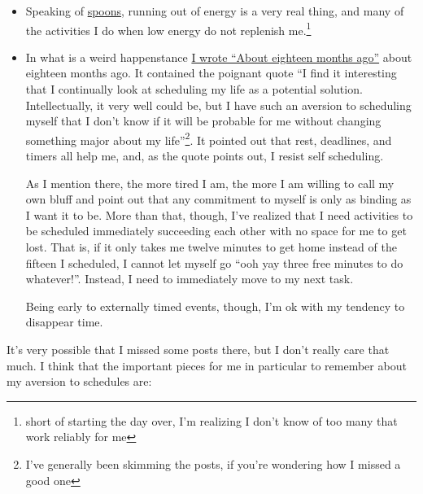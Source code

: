 \documentclass[12pt]{article}[titlepage]
\newcommand{\say}[1]{``#1''}
\renewcommand{\,}{\textsuperscript{,}}
\begin{document}
\begin{itemize}
\item Speaking of \href{spoons-and-spell-slots}{spoons}, running out of energy is a very real thing, and many of the activities I do when low energy do not replenish me.\footnote{short of starting the day over, I'm realizing I don't know of too many that work reliably for me}  
\item In what is a weird happenstance \href{spoons-2}{I wrote \say{About eighteen months ago}} about eighteen months ago. It contained the poignant quote \say{I find it interesting that I continually look at scheduling my life as a
potential solution. Intellectually, it very well could be, but I have
such an aversion to scheduling myself that I don’t know if it will be
probable for me without changing something major about my life}\footnote{I've generally been skimming the posts, if you're wondering how I missed a good one}. It pointed out that rest, deadlines, and timers all help me, and, as the quote points out, I resist self scheduling.

As I mention there, the more tired I am, the more I am willing to call my own bluff and point out that any commitment to myself is only as binding as I want it to be.  
More than that, though, I've realized that I need activities to be scheduled immediately succeeding each other with no space for me to get lost.  
That is, if it only takes me twelve minutes to get home instead of the fifteen I scheduled, I cannot let myself go \say{ooh yay three free minutes to do whatever!}.  
Instead, I need to immediately move to my next task.

Being early to externally timed events, though, I'm ok with my tendency to disappear time.  
\end{itemize}

It's very possible that I missed some posts there, but I don't really care that much.  
I think that the important pieces for me in particular to remember about my aversion to schedules are:
\end{document}
